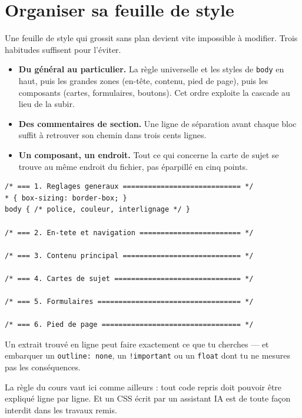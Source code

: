 \documentclass[a4paper,11pt]{article}
\begin{document}
\section{Organiser sa feuille de style}

Une feuille de style qui grossit sans plan devient vite impossible à modifier. Trois habitudes suffisent pour l'éviter.

\begin{itemize}
  \item \textbf{Du général au particulier.} La règle universelle et les styles de \texttt{body} en haut, puis les grandes zones (en-tête, contenu, pied de page), puis les composants (cartes, formulaires, boutons). Cet ordre exploite la cascade au lieu de la subir.
  \item \textbf{Des commentaires de section.} Une ligne de séparation avant chaque bloc suffit à retrouver son chemin dans trois cents lignes.
  \item \textbf{Un composant, un endroit.} Tout ce qui concerne la carte de sujet se trouve au même endroit du fichier, pas éparpillé en cinq points.
\end{itemize}

\begin{lstlisting}[language=CSS3, caption={Le squelette attendu pour le MiniForum}]
/* === 1. Reglages generaux ============================ */
* { box-sizing: border-box; }
body { /* police, couleur, interlignage */ }

/* === 2. En-tete et navigation ======================== */

/* === 3. Contenu principal ============================ */

/* === 4. Cartes de sujet ============================== */

/* === 5. Formulaires ================================== */

/* === 6. Pied de page ================================= */
\end{lstlisting}

\begin{tcolorbox}[interdit, title={Pas de CSS copié sans être compris}]
Un extrait trouvé en ligne peut faire exactement ce que tu cherches --- et embarquer un \texttt{outline: none}, un \texttt{!important} ou un \texttt{float} dont tu ne mesures pas les conséquences.

\vspace{3pt}
La règle du cours vaut ici comme ailleurs : tout code repris doit pouvoir être expliqué ligne par ligne. Et un CSS écrit par un assistant IA est de toute façon interdit dans les travaux remis.
\end{tcolorbox}
\end{document}
